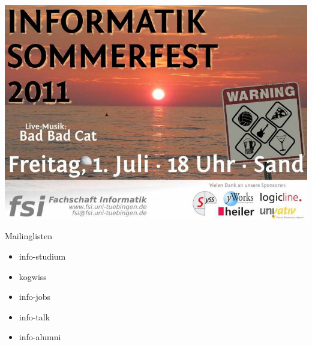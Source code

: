\documentclass{beamer}
\begin{document}
	\begin{frame}
		\includegraphics[width=\linewidth]{sf11.png}
	\end{frame}

	\begin{frame}[<+->]{Mailinglisten}
		\begin{itemize}
			\item info-studium
			\item kogwiss
			\item info-jobs
			\item info-talk
			\item info-alumni
		\end{itemize}
	\end{frame}
\end{document}
